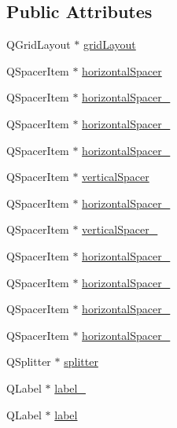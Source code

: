\subsection*{Public Attributes}
\begin{DoxyCompactItemize}
\item 
Q\-Grid\-Layout $\ast$ \hyperlink{classUi__Credits_a931689782ca1a0acbf9fbe3f8edc5739}{grid\-Layout}
\item 
Q\-Spacer\-Item $\ast$ \hyperlink{classUi__Credits_affbd440aaa12fdfad979f8b2e31e7a46}{horizontal\-Spacer}
\item 
Q\-Spacer\-Item $\ast$ \hyperlink{classUi__Credits_a0c8248996adebed0712930abf3cafaf7}{horizontal\-Spacer\-\_}
\item 
Q\-Spacer\-Item $\ast$ \hyperlink{classUi__Credits_a5934efa42af89b106190c54140193eca}{horizontal\-Spacer\-\_}
\item 
Q\-Spacer\-Item $\ast$ \hyperlink{classUi__Credits_a3b972dcff836aa9c3bbed108158562f5}{horizontal\-Spacer\-\_}
\item 
Q\-Spacer\-Item $\ast$ \hyperlink{classUi__Credits_a8fe922af97d73838d761606eab56cb80}{vertical\-Spacer}
\item 
Q\-Spacer\-Item $\ast$ \hyperlink{classUi__Credits_a9c073e4331ba2f413e46016a98520f1d}{horizontal\-Spacer\-\_}
\item 
Q\-Spacer\-Item $\ast$ \hyperlink{classUi__Credits_af68ec8e0f4b7c88ac4b79c0043c4fe14}{vertical\-Spacer\-\_}
\item 
Q\-Spacer\-Item $\ast$ \hyperlink{classUi__Credits_a7e4a3d261f8713d8ae018071d7d575e9}{horizontal\-Spacer\-\_}
\item 
Q\-Spacer\-Item $\ast$ \hyperlink{classUi__Credits_a55a724f96062fbf536d8262019aa57c7}{horizontal\-Spacer\-\_}
\item 
Q\-Spacer\-Item $\ast$ \hyperlink{classUi__Credits_ab15079bd50d1b48d183ee9b56b2401ed}{horizontal\-Spacer\-\_}
\item 
Q\-Spacer\-Item $\ast$ \hyperlink{classUi__Credits_a4b2adb97f25fff31827396df4551da99}{horizontal\-Spacer\-\_}
\item 
Q\-Splitter $\ast$ \hyperlink{classUi__Credits_a4b1b5439cb32cd9cc7b01954357d68f8}{splitter}
\item 
Q\-Label $\ast$ \hyperlink{classUi__Credits_a00840b0c2e5cec4427ce33cbf3278d76}{label\-\_}
\item 
Q\-Label $\ast$ \hyperlink{classUi__Credits_af6195bbddf09929e4594f42ab430553b}{label}
\item 

\end{DoxyCompactItemize}
